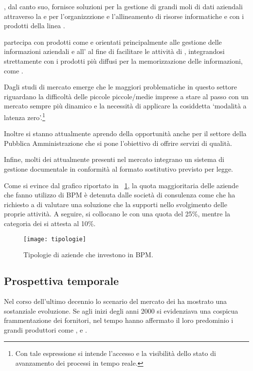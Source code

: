 , dal canto suo, fornisce soluzioni per la gestione di grandi moli di dati aziendali attraverso la   e per l'organizzzione e l'allineamento di risorse informatiche e  con i prodotti della linea .

 partecipa con prodotti come  e  orientati principalmente alle gestione delle informazioni aziendali e all' al fine di facilitare le attività di , integrandosi strettamente con i prodotti  più diffusi per la memorizzazione delle informazioni, come .

Dagli studi di mercato emerge che le maggiori problematiche in questo settore riguardano la difficoltà delle piccole piccole/medie imprese a stare al passo con un mercato sempre più dinamico e la necessità di applicare la cosiddetta `modalità a latenza zero'.\footnote{Con tale espressione si intende l'accesso e la visibilità dello stato di avanzamento dei processi in tempo reale.}

Inoltre si stanno attualmente aprendo della opportunità anche per il settore della Pubblica Amministrazione che si pone l'obiettivo di offrire servizi di qualità.

Infine, molti dei \sw attualmente presenti nel mercato integrano un sistema di gestione documentale in conformità al formato sostitutivo previsto per legge.

Come si evince dal grafico riportato in \figurename~\ref{fig:tipologie}, la quota maggioritaria delle aziende che fanno utilizzo di \sw BPM è detenuta dalle società di consulenza come \customer che ha richiesto a \team di valutare una soluzione che la supporti nello svolgimento delle proprie attività. A seguire, si collocano le \sw {} con una quota del 25\%, mentre la categoria dei  si attesta al 10\%.

\begin{figure}[H]
  \centering
  \texttt{[image: tipologie]}
  \caption{Tipologie di aziende che investono in \sw BPM.}
  \label{fig:tipologie}
\end{figure}

\subsection{Prospettiva temporale}
Nel corso dell'ultimo decennio lo scenario del mercato dei \sw ha mostrato una sostanziale evoluzione. Se agli inizi degli anni 2000 si evidenziava una cospicua frammentazione dei fornitori, nel tempo hanno affermato il loro predominio i grandi produttori come , e .

